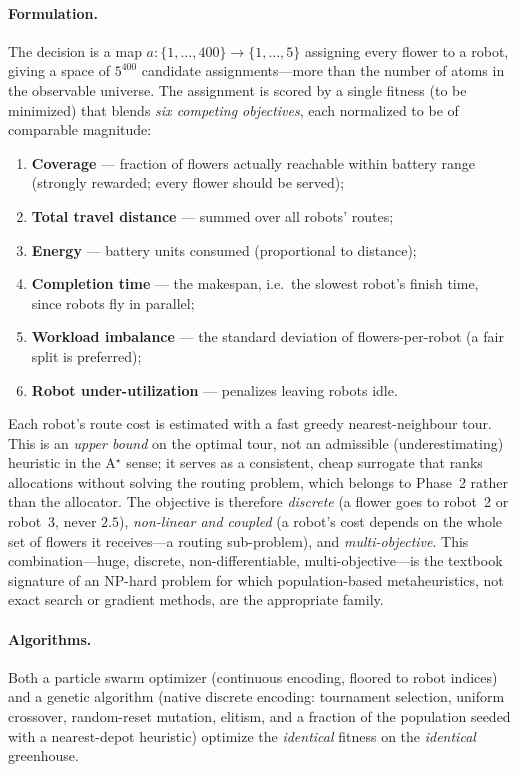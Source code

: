 \documentclass[10pt]{article}
\let\akparagraph\paragraph
\renewcommand{\paragraph}[1]{\Needspace*{4\baselineskip}\akparagraph{#1}}
\begin{document}
\paragraph{Formulation.}
The decision is a map $a:\{1,\dots,400\}\to\{1,\dots,5\}$ assigning every flower to
a robot, giving a space of $5^{400}$ candidate assignments---more than the number
of atoms in the observable universe. The assignment is scored by a single fitness
(to be minimized) that blends \emph{six competing objectives}, each normalized to
be of comparable magnitude:
\begin{enumerate}[leftmargin=1.5em,itemsep=0pt]
\item \textbf{Coverage} --- fraction of flowers actually reachable within battery
range (strongly rewarded; every flower should be served);
\item \textbf{Total travel distance} --- summed over all robots' routes;
\item \textbf{Energy} --- battery units consumed (proportional to distance);
\item \textbf{Completion time} --- the makespan, i.e.\ the slowest robot's finish
time, since robots fly in parallel;
\item \textbf{Workload imbalance} --- the standard deviation of flowers-per-robot
(a fair split is preferred);
\item \textbf{Robot under-utilization} --- penalizes leaving robots idle.
\end{enumerate}
Each robot's route cost is estimated with a fast greedy nearest-neighbour tour.
This is an \emph{upper bound} on the optimal tour, not an admissible
(underestimating) heuristic in the A$^\star$ sense; it serves as a consistent,
cheap surrogate that ranks allocations without solving the routing problem, which
belongs to Phase~2 rather than the allocator. The objective is therefore \emph{discrete} (a flower goes to robot~2
or robot~3, never $2.5$), \emph{non-linear and coupled} (a robot's cost depends on
the whole set of flowers it receives---a routing sub-problem), and
\emph{multi-objective}. This combination---huge, discrete, non-differentiable,
multi-objective---is the textbook signature of an NP-hard problem for which
population-based metaheuristics, not exact search or gradient methods, are the
appropriate family.

\paragraph{Algorithms.}
Both a particle swarm optimizer (continuous encoding, floored to robot indices)
and a genetic algorithm (native discrete encoding: tournament selection, uniform
crossover, random-reset mutation, elitism, and a fraction of the population seeded
with a nearest-depot heuristic) optimize the \emph{identical} fitness on the
\emph{identical} greenhouse.
\end{document}
